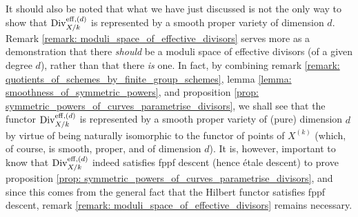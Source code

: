             It should also be noted that what we have just discussed is not the only way to show that $\mathrm{Div}_{X/k}^{\mathrm{eff}, (d)}$ is represented by a smooth proper variety of dimension $d$. Remark \ref{remark: moduli_space_of_effective_divisors} serves more as a demonstration that there \textit{should} be a moduli space of effective divisors (of a given degree $d$), rather than that there \textit{is} one. In fact, by combining remark \ref{remark: quotients_of_schemes_by_finite_group_schemes}, lemma \ref{lemma: smoothness_of_symmetric_powers}, and proposition \ref{prop: symmetric_powers_of_curves_parametrise_divisors}, we shall see that the functor $\mathrm{Div}_{X/k}^{\mathrm{eff}, (d)}$ is represented by a smooth proper variety of (pure) dimension $d$ by virtue of being naturally isomorphic to the functor of points of $X^{(k)}$ (which, of course, is smooth, proper, and of dimension $d$). It is, however, important to know that $\mathrm{Div}_{X/k}^{\mathrm{eff}, (d)}$ indeed satisfies fppf descent (hence \'etale descent) to prove proposition \ref{prop: symmetric_powers_of_curves_parametrise_divisors}, and since this comes from the general fact that the Hilbert functor satisfies fppf descent, remark \ref{remark: moduli_space_of_effective_divisors} remains necessary. 
            
